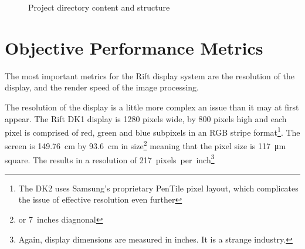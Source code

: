 \documentclass[MSc,paper=a4,pagesize=auto]{icldt}
\begin{document}
\begin{figure}
\centering
{}
\caption{Project directory content and structure}
\label{fig:project_directory_structure}
\end{figure}



\section{Objective Performance Metrics}

The most important metrics for the Rift display system are the resolution of the display, and the render speed of the image processing.

The resolution of the display is a little more complex an issue than it may at first appear. The Rift DK1 display is 1280 pixels wide, by 800 pixels high and each pixel is comprised of red, green and blue subpixels in an RGB stripe format\footnote{The DK2 uses Samsung's proprietary PenTile pixel layout, which complicates the issue of effective resolution even further}. The screen is \SI{149.76}{cm} by \SI{93.6}{cm} in size\footnote{or \SI{7}{inches} diagnonal} meaning that the pixel size is \SI{117}{\um} square. The results in a resolution of \SI{217}{pixels per inch}\footnote{Again, display dimensions are measured in inches. It is a strange industry.}
\end{document}
